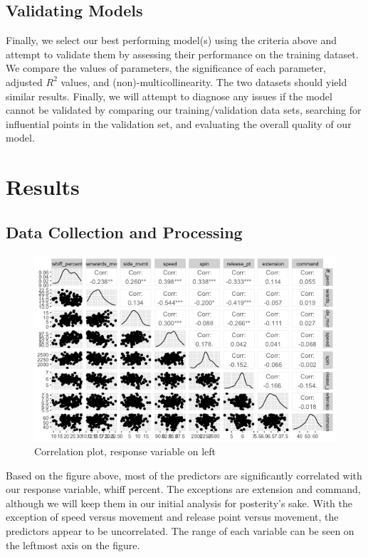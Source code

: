 \documentclass[12pt]{article}
\begin{document}
\subsection{Validating Models}
Finally, we select our best performing model(s) using the criteria above and attempt to validate them by assessing their performance on the training dataset. We compare the values of parameters, the significance of each parameter, adjusted $R^2$ values, and (non)-multicollinearity. The two datasets should yield similar results. Finally, we will attempt to diagnose any issues if the model cannot be validated by comparing our training/validation data sets, searching for influential points in the validation set, and evaluating the overall quality of our model.

\section{Results}
\subsection{Data Collection and Processing}
\begin{figure}[h]
    \begin{centering}
        \includegraphics[scale = 0.45]{pics/corr.png}
    \caption{Correlation plot, response variable on left}
    \end{centering}
\end{figure}
Based on the figure above, most of the predictors are significantly correlated with our response variable, whiff percent. The exceptions are extension and command, although we will keep them in our initial analysis for posterity's sake. With the exception of speed versus movement and release point versus movement, the predictors appear to be uncorrelated. The range of each variable can be seen on the leftmost axis on the figure.
\end{document}
